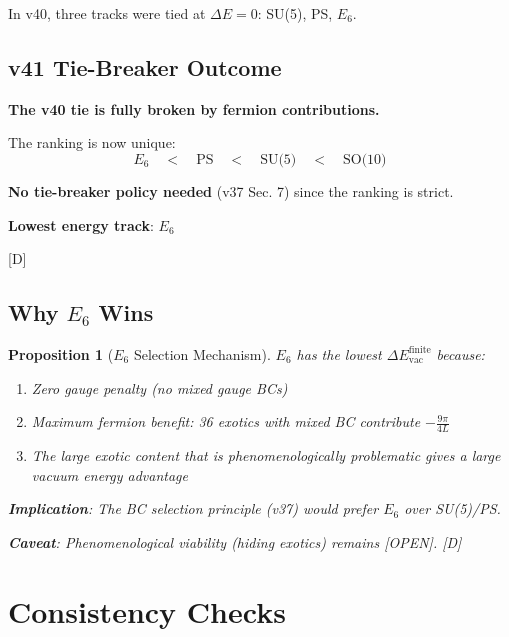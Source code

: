 \documentclass[11pt,a4paper]{article}
\newtheorem{proposition}[theorem]{Proposition}
\newcommand{\tagD}{\textcolor{blue!70!black}{[D]}}
\newcommand{\tagOPEN}{\textcolor{red!70!black}{[OPEN]}}
\begin{document}
In v40, three tracks were tied at $\Delta E = 0$: SU(5), PS, $E_6$.

\subsection{v41 Tie-Breaker Outcome}

\begin{resultbox}
\textbf{The v40 tie is fully broken by fermion contributions.}

The ranking is now unique:
\begin{equation}
\label{eq:unique-rank}
E_6 \quad < \quad \text{PS} \quad < \quad \text{SU(5)} \quad < \quad \text{SO(10)}
\end{equation}

\textbf{No tie-breaker policy needed} (v37 Sec. 7) since the ranking is strict.

\textbf{Lowest energy track}: $E_6$

\tagD
\end{resultbox}

\subsection{Why $E_6$ Wins}

\begin{proposition}[$E_6$ Selection Mechanism]
\label{prop:e6-wins}
$E_6$ has the lowest $\Delta E_{\text{vac}}^{\text{finite}}$ because:
\begin{enumerate}
    \item Zero gauge penalty (no mixed gauge BCs)
    \item Maximum fermion benefit: 36 exotics with mixed BC contribute $-\frac{9\pi}{4L}$
    \item The large exotic content that is phenomenologically problematic gives a
          large vacuum energy advantage
\end{enumerate}

\textbf{Implication}: The BC selection principle (v37) would prefer $E_6$ over SU(5)/PS.

\textbf{Caveat}: Phenomenological viability (hiding exotics) remains \tagOPEN.
\tagD
\end{proposition}

\section{Consistency Checks}
\end{document}
